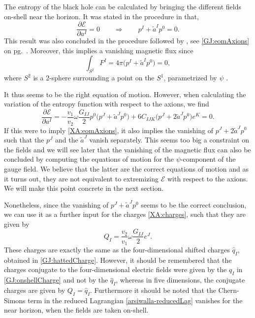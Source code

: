 \documentclass[12pt,twoside]{book}
\begin{document}
The entropy of the black hole can be calculated by bringing the different fields on-shell near the horizon. It was stated in the procedure in \cite{Arsiwalla:2008gc} that,
\begin{equation}\label{XA:eomAxions}
\frac{\partial \mathcal{E}}{\partial a^{I}} = 0 \qquad \Longrightarrow \qquad p^{I} + \tilde{a}^{I} p^{0} = 0.
\end{equation}
This result was also concluded in the procedure followed by \cite{Goldstein:2007kx}, see \eqref{GJ:eomAxions} on pg.\ \pageref{GJ:eomAxions}. Moreover, this implies a vanishing magnetic flux since
\begin{equation}\label{XA:vanishMagFlux}
\int_{S^{2}} F^{I} = 4\pi \big( p^{I} + \tilde{a}^{I} p^{0} \big) = 0,
\end{equation}
where $S^{2}$ is a 2-sphere surrounding a point on the $S^{1}$, parametrized by $\psi$ \cite{Emparan:2004fk}.

It thus seems to be the right equation of motion. However, when calculating the variation of the entropy function with respect to the axions, we find
\begin{equation}\label{XA:realeomAxions}
\frac{\partial \mathcal{E}}{\partial a^{I}} = 
-\frac{v_{1}}{v_{2}} \omega \frac{G_{IJ}}{2} p^{0} \big( p^{J} + \tilde{a}^{J} p^{0} \big)
+ 6 C_{IJK} \big( p^{J} + 2 \tilde{a}^{J} p^{0} \big) e^{K} = 0.
\end{equation}
If this were to imply \eqref{XA:eomAxions}, it also implies the vanishing of $ p^{J} + 2 \tilde{a}^{J} p^{0}$ such that the $p^{J}$ and the $\tilde{a}^{J}$ vanish separately. This seems too big a constraint on the fields and we will see later that the vanishing of the magnetic flux can also be concluded by computing the equations of motion for the $\psi$-component of the gauge field. We believe that the latter are the correct equations of motion and as it turns out, they are not equivalent to extremizing $\mathcal{E}$ with respect to the axions. We will make this point concrete in the next section.

Nonetheless, since the vanishing of $p^{J} + \tilde{a}^{J} p^{0}$ seems to be the correct conclusion, we can use it as a further input for the charges \eqref{XA:charges}, such that they are given by
\begin{equation}
Q_{I} = \frac{v_{2}}{v_{1}} \omega \frac{G_{IJ}}{2} e^{J}.
\end{equation}
These charges are exactly the same as the four-dimensional shifted charges $\hat{q}_{I}$, obtained in \eqref{GJ:hattedCharge}. However, it should be remembered that the charges conjugate to the four-dimensional electric fields were given by the $q_{I}$ in \eqref{GJ:onshellCharge} and not by the $\hat{q}_{I}$, whereas in five dimensions, the conjugate charges are given by $Q_{I} = \hat{q}_{I}$.
Furthermore it should be noted that the Chern-Simons term in the reduced Lagrangian \eqref{arsiwalla-reducedLag} vanishes for the near horizon, when the fields are taken on-shell.
\end{document}
